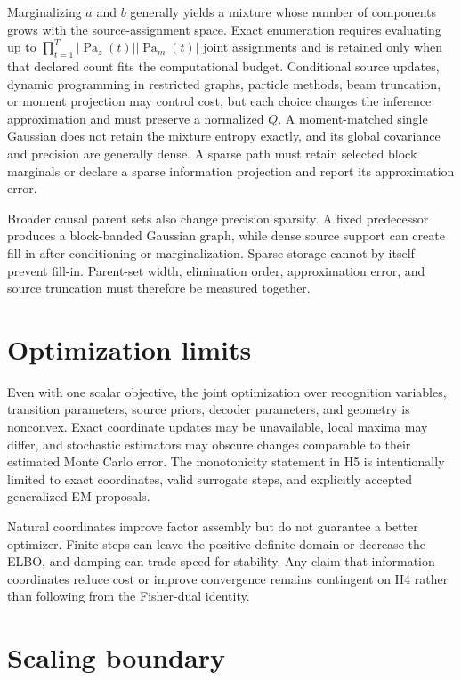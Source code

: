 Marginalizing $a$ and $b$ generally yields a mixture whose number of components grows with the source-assignment space. Exact enumeration requires evaluating up to $\prod_{t=1}^{T}|\operatorname{Pa}_z(t)||\operatorname{Pa}_m(t)|$ joint assignments and is retained only when that declared count fits the computational budget. Conditional source updates, dynamic programming in restricted graphs, particle methods, beam truncation, or moment projection may control cost, but each choice changes the inference approximation and must preserve a normalized $Q$. A moment-matched single Gaussian does not retain the mixture entropy exactly, and its global covariance and precision are generally dense. A sparse path must retain selected block marginals or declare a sparse information projection and report its approximation error.

Broader causal parent sets also change precision sparsity. A fixed predecessor produces a block-banded Gaussian graph, while dense source support can create fill-in after conditioning or marginalization. Sparse storage cannot by itself prevent fill-in. Parent-set width, elimination order, approximation error, and source truncation must therefore be measured together.

\section{Optimization limits}

Even with one scalar objective, the joint optimization over recognition variables, transition parameters, source priors, decoder parameters, and geometry is nonconvex. Exact coordinate updates may be unavailable, local maxima may differ, and stochastic estimators may obscure changes comparable to their estimated Monte Carlo error. The monotonicity statement in H5 is intentionally limited to exact coordinates, valid surrogate steps, and explicitly accepted generalized-EM proposals.

Natural coordinates improve factor assembly but do not guarantee a better optimizer. Finite steps can leave the positive-definite domain or decrease the ELBO, and damping can trade speed for stability. Any claim that information coordinates reduce cost or improve convergence remains contingent on H4 rather than following from the Fisher-dual identity.

\section{Scaling boundary}

